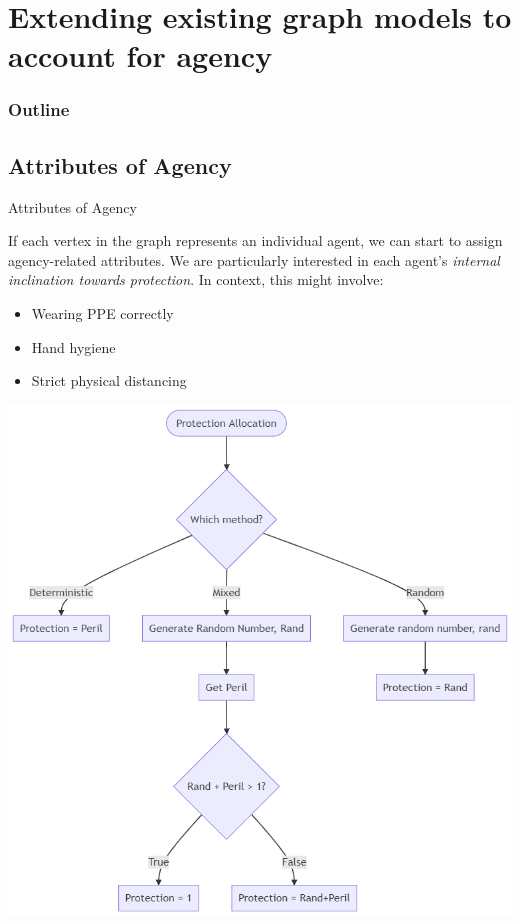\documentclass[unknownkeysallowed]{beamer}
\begin{document}
\section{Extending existing graph models to account for agency}

\begin{frame}
  \frametitle{Outline}
  \tableofcontents[currentsection]
\end{frame}
\subsection{Attributes of Agency}
\begin{frame}{Attributes of Agency}

If each vertex in the graph represents an individual agent, we can start to assign agency-related attributes. We are particularly interested in each agent's {\it internal inclination towards protection}. In context, this might involve:
\begin{itemize}
	\pause
	\item Wearing PPE correctly
	\pause
	\item Hand hygiene
	\pause
	\item Strict physical distancing
\end{itemize}

\end{frame}

\begin{frame}
\centering\includegraphics[height=.9\textheight]{assets/flowcharts/protection}
\end{frame}
\end{document}
